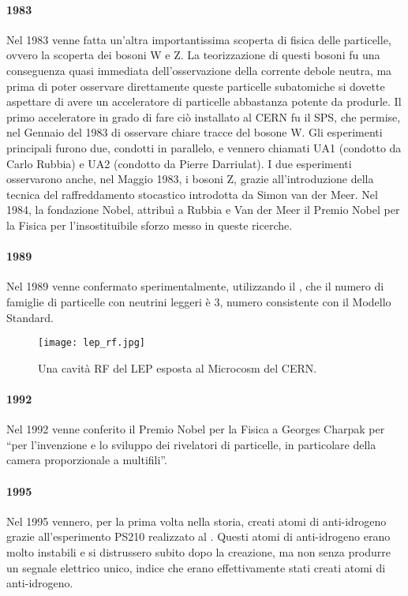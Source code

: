 			\paragraph{1983}Nel 1983 venne fatta un'altra importantissima scoperta di fisica delle particelle, ovvero la scoperta dei bosoni W e Z. La teorizzazione di questi bosoni fu una conseguenza quasi immediata dell'osservazione della corrente debole neutra, ma prima di poter osservare direttamente queste particelle subatomiche si dovette aspettare di avere un acceleratore di particelle abbastanza potente da produrle. Il primo acceleratore in grado di fare ciò installato al \ac{CERN} fu il \ac{SPS}, che permise, nel Gennaio del 1983 di osservare chiare tracce del bosone W. Gli esperimenti principali furono due, condotti in parallelo, e vennero chiamati UA1 (condotto da Carlo Rubbia) e UA2 (condotto da Pierre Darriulat). I due esperimenti osservarono anche, nel Maggio 1983, i bosoni Z, grazie all'introduzione della tecnica del raffreddamento stocastico introdotta da Simon van der Meer. Nel 1984, la fondazione Nobel, attribuì a Rubbia e Van der Meer il Premio Nobel per la Fisica per l'insostituibile sforzo messo in queste ricerche.
			
			\paragraph{1989}Nel 1989 venne confermato sperimentalmente, utilizzando il , che il numero di famiglie di particelle con neutrini leggeri è 3, numero consistente con il Modello Standard.
			
			\begin{figure}[h!]
				\begin{center}
					\texttt{[image: lep\_rf.jpg]}
				\end{center}
				\caption[Cavità RF del LEP]{Una cavità RF del LEP esposta al Microcosm del CERN.}
				\label{fig:lep_rf}
			\end{figure}
			
			\paragraph{1992}Nel 1992 venne conferito il Premio Nobel per la Fisica a Georges Charpak per ``per l'invenzione e lo sviluppo dei rivelatori di particelle, in particolare della camera proporzionale a multifili''.
			
			\paragraph{1995}Nel 1995 vennero, per la prima volta nella storia, creati atomi di anti-idrogeno grazie all'esperimento PS210 realizzato al . Questi atomi di anti-idrogeno erano molto instabili e si distrussero subito dopo la creazione, ma non senza produrre un segnale elettrico unico, indice che erano effettivamente stati creati atomi di anti-idrogeno.
			
